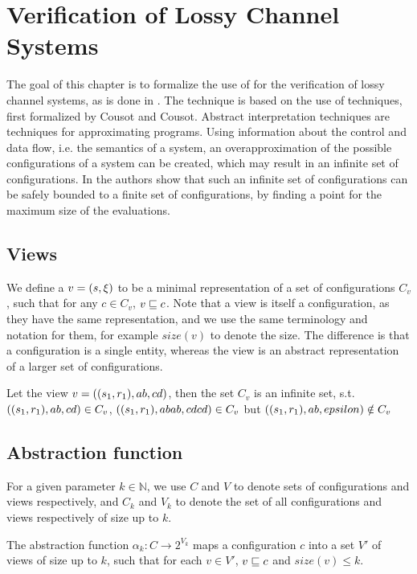 \newpage
\section{Verification of Lossy Channel Systems}
\label{model}
The goal of this chapter is to formalize the use of  for the verification of lossy channel systems, as is done in \cite{parosh}. The technique is based on the use of  techniques, first formalized by Cousot and Cousot\cite{cousot1977}. Abstract interpretation techniques are techniques for approximating programs. Using information about the control and data flow, i.e. the semantics of a system, an overapproximation of the possible configurations of a system can be created, which may result in an infinite set of configurations. In \cite{parosh} the authors show that such an infinite set of configurations can be safely bounded to a finite set of configurations, by finding a  point for the maximum size of the evaluations.


\subsection{Views}
\label{subwords}
We define a  $v= (s, \xi)$ to be a minimal representation of a set of configurations $C_v$, such that for any $c \in C_v$, $v \sqsubseteq c$. Note that a view is itself a configuration, as they have the same representation, and we use the same terminology and notation for them, for example $size(v)$ to denote the size. The difference is that a configuration is a single entity, whereas the view is an abstract representation of a larger set of configurations.

\begin{exmp}
Let the view $v = ((s_1, r_1), ab, cd)$, then the set $C_v$ is an infinite set, s.t. $((s_1, r_1), ab, cd) \in C_v$, $((s_1, r_1), abab, cdcd) \in C_v$ but $((s_1, r_1), ab, epsilon) \notin C_v$
\end{exmp}

\subsection{Abstraction function}
\label{alphagamma}
For a given parameter $k \in \mathbb{N}$, we use $C$ and $V$ to denote sets of configurations and views respectively, and $C_k$ and $V_k$ to denote the set of all configurations and views respectively of size up to $k$.

The abstraction function $\alpha_k: C\rightarrow 2^{V_k}$ maps a configuration $c$ into a set $V'$ of views of size up to $k$, such that for each $v\in V'$, $v \sqsubseteq c$ and $size(v) \leq k$.

